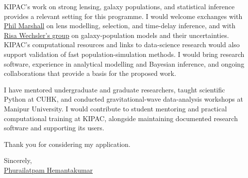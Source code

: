 \documentclass[11pt]{article}
\begin{document}
KIPAC's work on strong lensing, galaxy populations, and statistical inference provides a relevant setting for this programme. I would welcome exchanges with \href{https://kipac.stanford.edu/people/phil-marshall}{Phil Marshall} on lens modelling, selection, and time-delay inference, and with \href{https://kipac.stanford.edu/people/risa-wechsler}{Risa Wechsler's group} on galaxy-population models and their uncertainties. KIPAC's computational resources and links to data-science research would also support validation of fast population-simulation methods. I would bring research software, experience in analytical modelling and Bayesian inference, and ongoing collaborations that provide a basis for the proposed work.

I have mentored undergraduate and graduate researchers, taught scientific Python at CUHK, and conducted gravitational-wave data-analysis workshops at Manipur University. I would contribute to student mentoring and practical computational training at KIPAC, alongside maintaining documented research software and supporting its users.

Thank you for considering my application.

Sincerely,\\[4pt]
\href{https://hemantaph.com}{Phurailatpam Hemantakumar}
\end{document}
